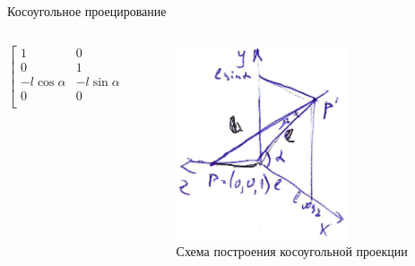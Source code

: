 \documentclass{beamer}
\begin{document}
	\begin{frame}{Косоугольное проецирование}
		\begin{columns}
			\begin{column}{0.5\textwidth}
				\[
					\begin{bmatrix}
						1 & 0 & 0 & 0 \\
						0 & 1 & 0 & 0 \\
						-l \cos \alpha & - l \sin \alpha & 1 & 0 \\
						0 & 0 & 0 & 1 \\
					\end{bmatrix}	
				\]
			\end{column}
			\begin{column}{0.5\textwidth}
				\begin{figure} 
						\includegraphics[width=0.7\textwidth]{images/oblique_sceme.png}
					\caption{Схема построения косоугольной проекции}
				\end{figure}
			\end{column}
		\end{columns}
		\note{

		}
	\end{frame}
\end{document}
